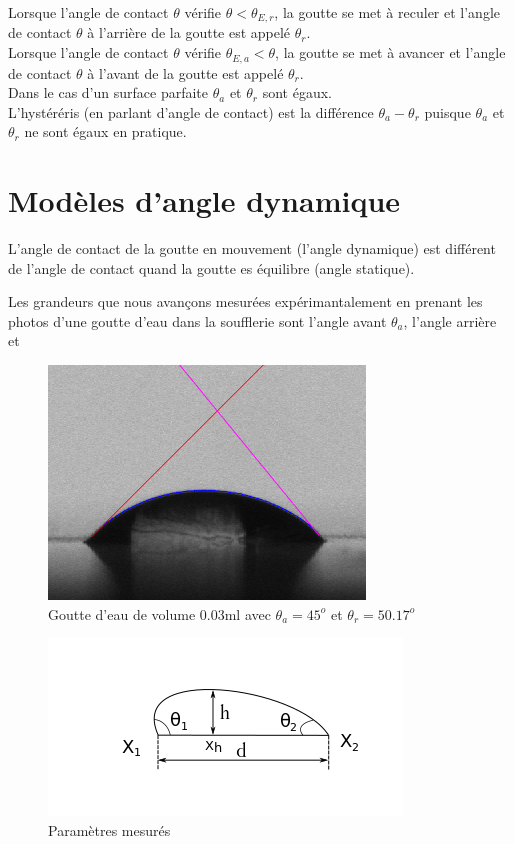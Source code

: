 \documentclass[french]{article}
\begin{document}
Lorsque l'angle de contact $\theta$ vérifie $\theta < \theta_{E,r}$, la goutte se met à reculer et l'angle de contact $\theta$ à l'arrière de la goutte est appelé $\theta_{r}$.\\

Lorsque l'angle de contact $\theta$ vérifie $\theta_{E,a} < \theta$, la goutte se met à avancer et l'angle de contact $\theta$ à l'avant de la goutte est appelé $\theta_{r}$.\\

Dans le cas d'un surface parfaite $\theta_{a}$ et $\theta_{r}$ sont égaux.\\

L'hystéréris (en parlant d'angle de contact) est la différence $\theta_{a}-\theta_{r}$ puisque $\theta_{a}$ et $\theta_{r}$ ne sont égaux en pratique.

\section{Modèles d'angle dynamique}

L'angle de contact de la goutte en mouvement (l'angle dynamique) est différent de l'angle de contact quand la goutte es équilibre (angle statique).



Les grandeurs que nous avançons mesurées expérimantalement en prenant les photos d'une goutte d'eau dans la soufflerie sont l'angle avant $\theta_{a}$, l'angle arrière et 



\begin{figure}[ht]
	\centering
	\includegraphics[scale = 0.6]{./image/crop_tvitesse=28_volume=003.png}
	\caption{Goutte d'eau de volume $0.03$ml avec $\theta_{a} = 45^{o}$ et $\theta_{r} = 50.17^{o}$}
\end{figure}

\begin{figure}[ht]
	\centering
	\includegraphics[scale = 1]{./image/rrgou2.png}
	\caption{Paramètres mesurés}
\end{figure}
\end{document}
